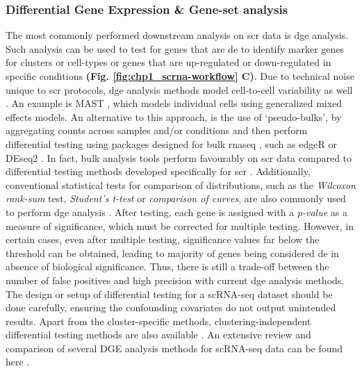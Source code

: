 \subsubsection{Differential Gene Expression \& Gene-set analysis}
The most commonly performed downstream analysis on \gls{scr} data is \gls{dge} analysis. Such analysis can be used to test for genes that are \gls{de} to identify marker genes for clusters or cell-types or genes that are up-regulated or down-regulated in specific conditions \textbf{(Fig. \ref{fig:chp1_scrna-workflow} C)}. %
Due to technical noise unique to \gls{scr} protocols, \gls{dge} analysis methods model cell-to-cell variability as well \textbf{\cite{das_comprehensive_2021}}. An example is MAST \textbf{\cite{finak_mast_2015}}, which models individual cells using generalized mixed effects models. An alternative to this approach, is the use of `pseudo-bulks’, by aggregating counts across samples and/or conditions and then perform differential testing using packages designed for bulk \gls{rnaseq} \textbf{\cite{lueckenmalte_d_current_2019,heumos_best_2023}}, such as edgeR \textbf{\cite{robinson_edger_2009}} or DEseq2 \textbf{\cite{love_moderated_2014}}. In fact, bulk analysis tools perform favourably on \gls{scr} data compared to differential testing methods developed specifically for \gls{scr} \textbf{\cite{das_comprehensive_2021,squair_confronting_2021,van_den_berge_observation_2018,soneson_bias_2018}}. Additionally, conventional statistical tests for comparison of distributions, such as the \textit{Wilcoxon rank-sum} test, \textit{Student's t-test} or \textit{comparison of  curves}, are also commonly used to perform \gls{dge} analysis \textbf{\cite{butler_integrating_2018}}. After testing, each gene is assigned with a \textit{p-value} as a measure of significance, which must be corrected for multiple testing. However, in certain cases, even after multiple testing, significance values far below the threshold can be obtained, leading to majority of genes being considered \gls{de} in absence of biological significance. Thus, there is still a trade-off between the number of false positives and high precision with current \gls{dge} analysis methods. The design or setup of differential testing for a scRNA-seq dataset should be done carefully, ensuring the confounding covariates do not output unintended results. Apart from the cluster-specific methods, clustering-independent differential testing methods are also available \textbf{\cite{vandenbon_clustering-independent_2020,kim_marcopolo_2022,vlot_cluster-independent_2022}}. An extensive review and comparison of several DGE analysis methods for scRNA-seq data can be found here \textbf{\cite{das_comprehensive_2021,squair_confronting_2021,wang_comparative_2019,das_differential_2022,nguyen_benchmarking_2023}}.\\

